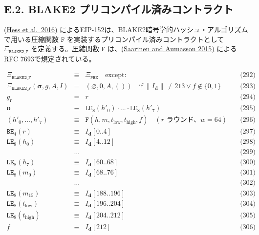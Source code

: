 \documentclass[
]{ltjsarticle}
\begin{document}
\hypertarget{e.2.-blake2-ux30d7ux30eaux30b3ux30f3ux30d1ux30a4ux30ebux6e08ux307fux30b3ux30f3ux30c8ux30e9ux30afux30c8}{%
\subsection{E.2. BLAKE2
プリコンパイル済みコントラクト}\label{e.2.-blake2-ux30d7ux30eaux30b3ux30f3ux30d1ux30a4ux30ebux6e08ux307fux30b3ux30f3ux30c8ux30e9ux30afux30c8}}

\protect\hyperlink{ref-EIP-152}{(Hess et al.~2016)}
によるEIP-152は、BLAKE2暗号学的ハッシュ・アルゴリズムで用いる圧縮関数
\(\mathtt{F}\) を実装するプリコンパイル済みコントラクトとして
\(\Xi_{\mathtt{BLAKE2\_F}}\) を定義する。圧縮関数 \(\mathtt{F}\)
は、\protect\hyperlink{ref-RFC-7693}{(Saarinen and Aumasson 2015)}
によるRFC 7693で規定されている。

\protect\hypertarget{eq-292}{}{}\protect\hypertarget{eq-293}{}{}\protect\hypertarget{eq-294}{}{}\protect\hypertarget{eq-295}{}{}\protect\hypertarget{eq-296}{}{}\protect\hypertarget{eq-297}{}{}\protect\hypertarget{eq-298}{}{}\protect\hypertarget{eq-299}{}{}\protect\hypertarget{eq-300}{}{}\protect\hypertarget{eq-301}{}{}\protect\hypertarget{eq-302}{}{}\protect\hypertarget{eq-303}{}{}\protect\hypertarget{eq-304}{}{}\protect\hypertarget{eq-305}{}{}\protect\hypertarget{eq-306}{}{}

\[\begin{aligned}
\Xi_{\mathtt{BLAKE2\_F}}&\equiv&\Xi_{\mathtt{PRE}}\quad\text{except:} & \qquad \text{(292)} \\
\Xi_{\mathtt{BLAKE2\_F}}(\boldsymbol\sigma,g,A,I)&=&\left(\varnothing,0,A,()\right)\quad\text{if}\ \lVert I_{\mathbf{d}}\rVert \neq 213 \vee f \notin \{0, 1\} & \qquad \text{(293)} \\
g_{\mathrm{r}} &=& r & \qquad \text{(294)} \\
\mathbf{o} &\equiv& \mathtt{LE}_8(h'_0)\cdot ... \cdot \mathtt{LE}_8(h'_7) & \qquad \text{(295)} \\
(h'_0,\dots,h'_7) &\equiv& \mathtt{F}(h, m, t_\mathrm{low}, t_\mathrm{high}, f) \quad(r\text{ ラウンド、}w = 64) & \qquad \text{(296)} \\
\mathtt{BE}_4(r) &\equiv& I_{\mathbf{d}}[0..4] & \qquad \text{(297)} \\
\mathtt{LE}_8(h_0) &\equiv& I_{\mathbf{d}}[4..12] & \qquad \text{(298)} \\
&\dots& & \qquad \text{(299)} \\
\mathtt{LE}_8(h_7) &\equiv& I_{\mathbf{d}}[60..68] & \qquad \text{(300)} \\
\mathtt{LE}_8(m_0) &\equiv& I_{\mathbf{d}}[68..76] & \qquad \text{(301)} \\
&\dots& & \qquad \text{(302)} \\
\mathtt{LE}_8(m_{15}) &\equiv& I_{\mathbf{d}}[188..196] & \qquad \text{(303)} \\
\mathtt{LE}_8(t_\mathrm{low}) &\equiv& I_{\mathbf{d}}[196..204] & \qquad \text{(304)} \\
\mathtt{LE}_8(t_\mathrm{high}) &\equiv& I_{\mathbf{d}}[204..212] & \qquad \text{(305)} \\
f &\equiv& I_{\mathbf{d}}[212] & \qquad \text{(306)}
\end{aligned}\]
\end{document}
